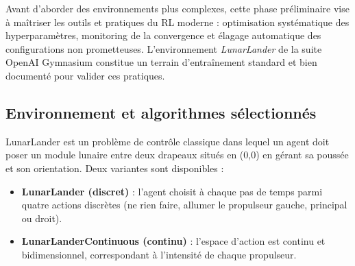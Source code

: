
Avant d'aborder des environnements plus complexes, cette phase préliminaire
vise à maîtriser les outils et pratiques du RL moderne : optimisation
systématique des hyperparamètres, monitoring de la convergence et élagage
automatique des configurations non prometteuses. L'environnement
\textit{LunarLander} de la suite OpenAI Gymnasium constitue un terrain
d'entraînement standard et bien documenté pour valider ces pratiques.

\subsection{Environnement et algorithmes sélectionnés}

LunarLander \parencite{GymnasiumDocumentationLunarLander} est un problème de
contrôle classique dans lequel un agent doit poser un module lunaire entre deux
drapeaux situés en (0,0) en gérant sa poussée et son orientation. Deux
variantes sont disponibles :

\begin{itemize}
  \item \textbf{LunarLander (discret)} : l'agent choisit à chaque pas de
        temps parmi quatre actions discrètes (ne rien faire, allumer le
        propulseur gauche, principal ou droit).
  \item \textbf{LunarLanderContinuous (continu)} : l'espace d'action est
        continu et bidimensionnel, correspondant à l'intensité de chaque
        propulseur.
\end{itemize}

